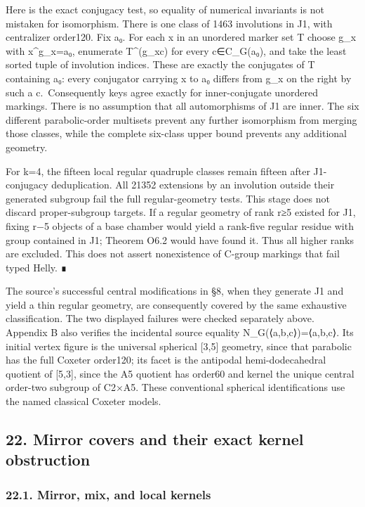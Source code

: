 \documentclass[
  10pt,
  letterpaper,
]{article}
\newcounter{none} %
\begin{document}
Here is the exact conjugacy test, so equality of numerical invariants is
not mistaken for isomorphism. There is one class of 1463 involutions in
J1, with centralizer order120. Fix a₀. For each x in an unordered marker
set T choose g\_x with x\^{}g\_x=a₀, enumerate T\^{}(g\_xc) for every
c∈C\_G(a₀), and take the least sorted tuple of involution indices. These
are exactly the conjugates of T containing a₀: every conjugator carrying
x to a₀ differs from g\_x on the right by such a c.~Consequently keys
agree exactly for inner-conjugate unordered markings. There is no
assumption that all automorphisms of J1 are inner. The six different
parabolic-order multisets prevent any further isomorphism from merging
those classes, while the complete six-class upper bound prevents any
additional geometry.

For k=4, the fifteen local regular quadruple classes remain fifteen
after J1-conjugacy deduplication. All 21352 extensions by an involution
outside their generated subgroup fail the full regular-geometry tests.
This stage does not discard proper-subgroup targets. If a regular
geometry of rank r≥5 existed for J1, fixing r−5 objects of a base
chamber would yield a rank-five regular residue with group contained in
J1; Theorem O6.2 would have found it. Thus all higher ranks are
excluded. This does not assert nonexistence of C-group markings that
fail typed Helly. ∎

The source's successful central modifications in §8, when they generate
J1 and yield a thin regular geometry, are consequently covered by the
same exhaustive classification. The two displayed failures were checked
separately above. Appendix B also verifies the incidental source
equality N\_G(⟨a,b,c⟩)=⟨a,b,c⟩. Its initial vertex figure is the
universal spherical {[}3,5{]} geometry, since that parabolic has the
full Coxeter order120; its facet is the antipodal hemi-dodecahedral
quotient of {[}5,3{]}, since the A5 quotient has order60 and kernel the
unique central order-two subgroup of C2×A5. These conventional spherical
identifications use the named classical Coxeter models.

\subsection{22. Mirror covers and their exact kernel
obstruction}\label{mirror-covers-and-their-exact-kernel-obstruction}

\subsubsection{22.1. Mirror, mix, and local
kernels}\label{mirror-mix-and-local-kernels}
\end{document}
